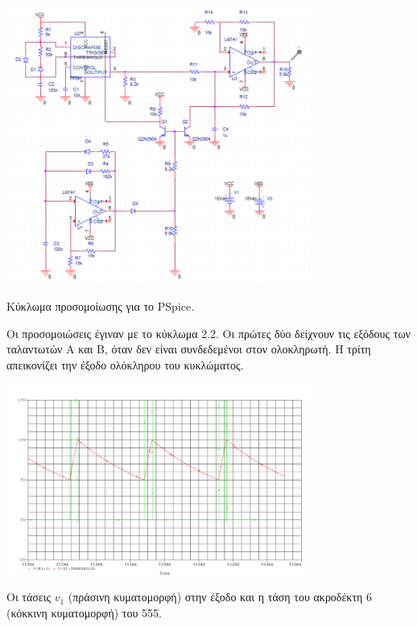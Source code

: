 \begin{center}
	\begin{circuitfig}[H]
		\centering
		\includegraphics[width=10cm]{spice_02/lab 2 circuit}
		\caption{Κύκλωμα προσομοίωσης για το PSpice.}
		\label{circ:2_schematik}
	\end{circuitfig}
\end{center}

Οι προσομοιώσεις έγιναν με το κύκλωμα 2.2. Οι πρώτες δύο δείχνουν τις εξόδους των ταλαντωτών Α και Β, όταν δεν είναι συνδεδεμένοι στον ολοκληρωτή. Η τρίτη απεικονίζει την έξοδο ολόκληρου του κυκλώματος.

\begin{plot_fig}[H]
	\begin{center}
		\includegraphics[width=10cm]{spice_02/lab2 q3.1}
		\caption{Οι τάσεις $v_1$ (πράσινη κυματομορφή) στην έξοδο και η τάση του ακροδέκτη 6 (κόκκινη κυματομορφή) του 555.}
		\label{plot:ask2:q3_1}
	\end{center}
\end{plot_fig}

